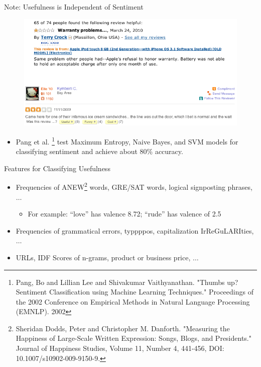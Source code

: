 \documentclass{beamer}
\begin{document}
\begin{frame}{Note: Usefulness is Independent of Sentiment}
\begin{figure}[h]
  \centering
  \includegraphics[scale=.4]{review_ex_2}
  \label{fig:dist}
\end{figure}
\begin{itemize}
\item Pang et al. \footnote{{\tiny Pang, Bo and Lillian Lee and Shivakumar Vaithyanathan.  "Thumbs
up?  Sentiment Classification using Machine Learning Techniques."
Proceedings of the 2002 Conference on Empirical Methods in Natural
Language Processing (EMNLP). 2002}} test Maximum Entropy, Naive Bayes, and SVM models for classifying sentiment and achieve about 80\% accuracy.\\
\end{itemize}
\end{frame}


\begin{frame}{Features for Classifying Usefulness}
\begin{itemize}
\item Frequencies of ANEW\footnote{{\tiny Sheridan Dodds, Peter and Christopher M. Danforth. "Measuring the Happiness of Large-Scale Written Expression: Songs, Blogs, and Presidents."  Journal of Happiness Studies, Volume 11, Number 4, 441-456, DOI: 10.1007/s10902-009-9150-9. }} words, GRE/SAT words, logical signposting phrases, $\ldots$ 
\begin{itemize}
\item For example: ``love'' has valence 8.72; ``rude'' has valence of 2.5
\end{itemize}
\item Frequencies of grammatical errors, typpppos, capitalization IrReGuLARIties, $\ldots$
\item URLs, IDF Scores of n-grams, product or business price, $\ldots$
\end{itemize}
\end{frame}
\end{document}
